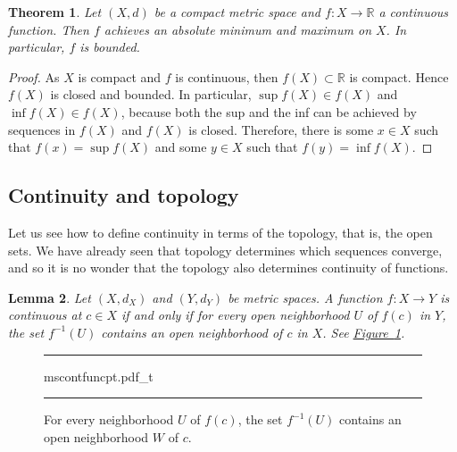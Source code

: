 \documentclass[12pt,openany]{book}
\newcommand{\R}{{\mathbb{R}}}
\theoremstyle{plain}
\newtheorem{thm}{Theorem}[section]
\newtheorem{lemma}[thm]{Lemma}
\theoremstyle{remark}
\theoremstyle{definition}
\newenvironment{myfig}{%
\begin{figure}[h!t]
\noindent\rule{\textwidth}{0.4pt}\vspace{12pt}\par\centering}%
{\par\noindent\rule{\textwidth}{0.4pt}
\end{figure}}
\theoremstyle{exercise}
\theoremstyle{example}
\newcommand{\figureref}[1]{\hyperref[#1]{Figure~\ref*{#1}}}
\begin{document}
\begin{thm}
Let $(X,d)$ be a compact metric space
and $f \colon X \to \R$ a continuous function.  Then
$f$ achieves an absolute minimum and maximum on $X$.
In particular, $f$ is bounded.
\end{thm}

\begin{proof}
As $X$ is compact and $f$ is continuous, then
$f(X) \subset \R$ is compact.  Hence $f(X)$ is closed
and bounded.  In particular,
$\sup f(X) \in f(X)$ and
$\inf f(X) \in f(X)$, because both the sup and the inf
can be achieved by sequences in $f(X)$ and $f(X)$ is closed.
Therefore, there is some $x \in X$ such that $f(x) = \sup f(X)$
and some $y \in X$ such that $f(y) = \inf f(X)$.
\end{proof}

\subsection{Continuity and topology}

Let us see how to define continuity in terms of the topology, that is,
the open sets.  We have already seen that topology determines which 
sequences converge, and so it is no wonder that the topology also
determines continuity of functions.

\begin{lemma} \label{lemma:mstopocontloc}
Let $(X,d_X)$ and $(Y,d_Y)$ be metric spaces.
A function $f \colon X \to Y$ is continuous at $c \in X$
if and only if for every open neighborhood $U$ of $f(c)$ in $Y$, the set
$f^{-1}(U)$ contains an open neighborhood of $c$ in $X$.
See \figureref{fig:mscontfuncpt}.
\end{lemma}

\begin{myfig}
{mscontfuncpt.pdf_t}
\caption{For every neighborhood $U$ of $f(c)$, the set $f^{-1}(U)$ contains an open
neighborhood $W$ of $c$.\label{fig:mscontfuncpt}}
\end{myfig}
\end{document}
